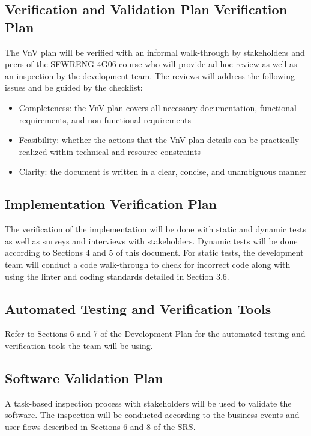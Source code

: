 \documentclass[12pt, titlepage]{article}
\begin{document}
\subsection{Verification and Validation Plan Verification Plan}
The VnV plan will be verified with an informal walk-through by stakeholders and peers of the SFWRENG 4G06 course who will provide ad-hoc review as well as an inspection by the development team. The reviews will address the following issues and be guided by the checklist:
\begin{itemize}
    \item Completeness: the VnV plan covers all necessary documentation, functional requirements, and non-functional requirements
    \item Feasibility: whether the actions that the VnV plan details can be practically realized within technical and resource constraints
    \item Clarity: the document is written in a clear, concise, and unambiguous manner
\end{itemize}

\subsection{Implementation Verification Plan}
The verification of the implementation will be done with static and dynamic tests as well as surveys and interviews with stakeholders. Dynamic tests will be done according to Sections 4 and 5 of this document. For static tests, the development team will conduct a code walk-through to check for incorrect code along with using the linter and coding standards detailed in Section 3.6.

\subsection{Automated Testing and Verification Tools}
Refer to Sections 6 and 7 of the \href{https://github.com/r-yeh/grocery-spending-tracker/blob/master/docs/DevelopmentPlan/DevelopmentPlan.pdf}{Development Plan} for the automated testing and verification tools the team will be using.

\subsection{Software Validation Plan}
A task-based inspection process with stakeholders will be used to validate the software. The inspection will be conducted according to the business events and user flows described in Sections 6 and 8 of the \href{https://github.com/r-yeh/grocery-spending-tracker/blob/master/docs/SRS/SRS.pdf}{SRS}.
\end{document}
